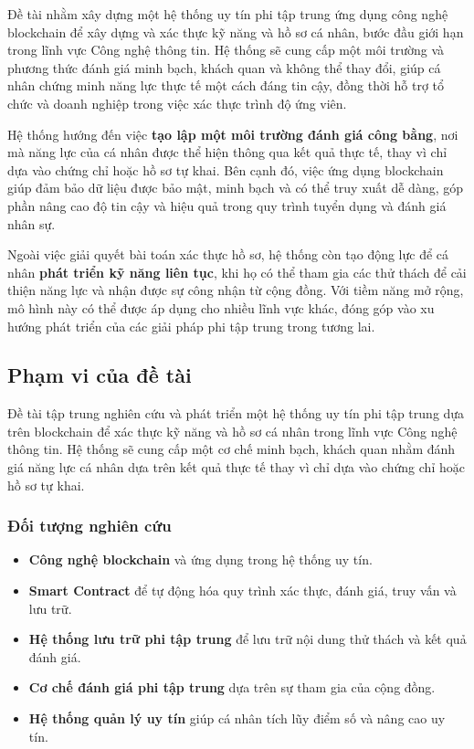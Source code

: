 \documentclass{article}[14pt]
\begin{document}
{    Đề tài nhằm xây dựng một hệ thống uy tín phi tập trung ứng dụng công nghệ blockchain để xây dựng và xác thực kỹ năng và hồ sơ cá nhân, bước đầu giới hạn trong lĩnh vực Công nghệ thông tin. 
    Hệ thống sẽ cung cấp một môi trường và phương thức đánh giá minh bạch, khách quan và không thể thay đổi, giúp cá nhân chứng minh năng lực thực tế một cách đáng tin cậy, 
    đồng thời hỗ trợ tổ chức và doanh nghiệp trong việc xác thực trình độ ứng viên.

    Hệ thống hướng đến việc \textbf{tạo lập một môi trường đánh giá công bằng}, nơi mà năng lực của cá nhân được thể hiện thông qua kết quả thực tế, 
    thay vì chỉ dựa vào chứng chỉ hoặc hồ sơ tự khai. Bên cạnh đó, việc ứng dụng blockchain giúp đảm bảo dữ liệu được bảo mật, 
    minh bạch và có thể truy xuất dễ dàng, góp phần nâng cao độ tin cậy và hiệu quả trong quy trình tuyển dụng và đánh giá nhân sự.

    Ngoài việc giải quyết bài toán xác thực hồ sơ, hệ thống còn tạo động lực để cá nhân \textbf{phát triển kỹ năng liên tục}, khi họ có thể tham gia các thử thách 
    để cải thiện năng lực và nhận được sự công nhận từ cộng đồng. Với tiềm năng mở rộng, mô hình này có thể được áp dụng cho nhiều lĩnh vực khác, 
    đóng góp vào xu hướng phát triển của các giải pháp phi tập trung trong tương lai.
    
    \subsection{Phạm vi của đề tài}
    
    Đề tài tập trung nghiên cứu và phát triển một hệ thống uy tín phi tập trung dựa trên blockchain để xác thực kỹ năng và hồ sơ cá nhân trong lĩnh vực Công nghệ thông tin. 
    Hệ thống sẽ cung cấp một cơ chế minh bạch, khách quan nhằm đánh giá năng lực cá nhân dựa trên kết quả thực tế thay vì chỉ dựa vào chứng chỉ hoặc hồ sơ tự khai.

    \subsubsection{Đối tượng nghiên cứu}
    \begin{itemize}
        \item \textbf{Công nghệ blockchain} và ứng dụng trong hệ thống uy tín.
        \item \textbf{Smart Contract} để tự động hóa quy trình xác thực, đánh giá, truy vấn và lưu trữ.
        \item \textbf{Hệ thống lưu trữ phi tập trung} để lưu trữ nội dung thử thách và kết quả đánh giá.
        \item \textbf{Cơ chế đánh giá phi tập trung} dựa trên sự tham gia của cộng đồng.
        \item \textbf{Hệ thống quản lý uy tín} giúp cá nhân tích lũy điểm số và nâng cao uy tín.
    \end{itemize}

}
\end{document}
